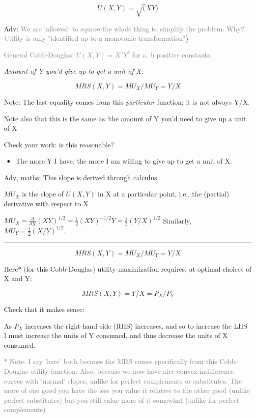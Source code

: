 \documentclass[]{article}
\providecommand{\tightlist}{%
  \setlength{\itemsep}{0pt}\setlength{\parskip}{0pt}}
\begin{document}
\[ U(X,Y)=\sqrt(XY) \]

\textcolor{RawSienna}{Adv:} \textcolor{gray}{We are 'allowed' to square the whole thing to simplify the problem. Why? Utility is only "identified up to a monotonic transformation"}\}

\textcolor{RawSienna}{\textcolor{gray}{General Cobb-Douglas: $U(X,Y)=X^a Y^b$ for a, b positive constants.}}

\emph{Amount of Y you'd give up to get a unit of X:}

\[MRS(X,Y)= MU_X/MU_Y = Y/X\]

Note: The last equality comes from this \emph{particular} function; it is not always Y/X.

Note also that this is the same as 'the amount of Y you'd need to give up a unit of X

\bigskip

Check your work: is this reasonable?

\begin{itemize}
\tightlist
\item
  The more Y I have, the more I am willing to give up to get a unit of X.
\end{itemize}

\textcolor{RawSienna}{Adv, maths: This slope is derived through calculus. }

\(MU_X\) is the slope of \(U(X,Y)\) in X at a particular point,
i.e., the (partial) derivative with respect to X

\(MU_X = \frac{\partial}{\partial X} (XY)^{1/2} = \frac{1}{2} (XY)^{-1/2}Y = \frac{1}{2} (Y/X)^{1/2}\)
Similarly, \(MU_Y = \frac{1}{2}(X/Y)^{1/2}\).

\begin{center}\rule{0.5\linewidth}{\linethickness}\end{center}

\[MRS(X,Y)= MU_X/MU_Y = Y/X\]

\bigskip

Here\(\ast\) (for this Cobb-Douglas) utility-maximization requires, at optimal choices of X and Y:

\[MRS(X,Y)= Y/X = P_X/P_Y\]

Check that it makes sense:

As \(P_X\) increases the right-hand-side (RHS) increases, and so to increase the LHS I must increase the units of Y consumed,
and thus decrease the units of X consumed.

\textcolor{gray}{$\ast$ Note: I say 'here' both because the MRS comes specifically from this Cobb-Douglas utility function. Also, because we now have nice convex indifference curves with 'normal' slopes, unlike for perfect complements or substitutes. The more of one good you have the less you value it relative to the other good (unlike perfect substitutes)
 but you still value more of it somewhat (unlike for perfect complements)}
\end{document}

